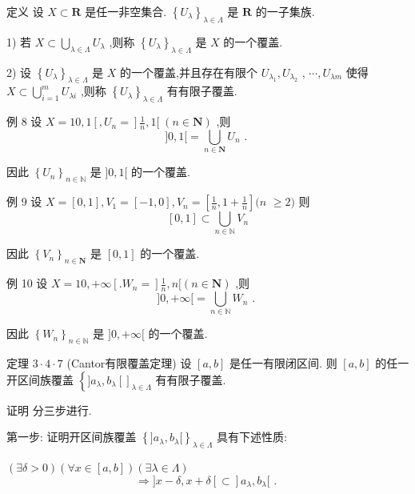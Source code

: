 定义 设 $X \subset  \mathbf{R}$ 是任一非空集合. ${\left\{  {U}_{\lambda }\right\}  }_{\lambda  \in  \Lambda }$ 是 $\mathbf{R}$ 的一子集族.

1) 若 $X \subset  \mathop{\bigcup }\limits_{{\lambda  \in  \Lambda }}{U}_{\lambda }$ ,则称 ${\left\{  {U}_{\lambda }\right\}  }_{\lambda  \in  \Lambda }$ 是 $X$ 的一个覆盖.

2) 设 ${\left\{  {U}_{\lambda }\right\}  }_{\lambda  \in  \Lambda }$ 是 $X$ 的一个覆盖,并且存在有限个 ${U}_{{\lambda }_{1}},{U}_{{\lambda }_{2}}$ , $\cdots ,{U}_{\lambda m}$ 使得 $X \subset  \mathop{\bigcup }\limits_{{i = 1}}^{m}{U}_{\lambda i}$ ,则称 ${\left\{  {U}_{\lambda }\right\}  }_{\lambda  \in  \Lambda }$ 有有限子覆盖.

例 8 设 $X = {10},1\left\lbrack  {,{U}_{n} = }\right\rbrack  \frac{1}{n},1\lbrack \;\left( {n \in  \mathbf{N}}\right)$ ,则
$$\rbrack 0,1\lbrack  = \mathop{\bigcup }\limits_{{n \in  \mathbf{N}}}{U}_{n}\text{ . }$$

因此 ${\left\{  {U}_{n}\right\}  }_{n \in  \mathbb{N}}$ 是 $\rbrack 0,1\lbrack$ 的一个覆盖.

例 9 设 $X = \left\lbrack  {0,1}\right\rbrack  ,{V}_{1} = \left\lbrack  {-1,0}\right\rbrack  ,{V}_{n} = \left\lbrack  {\frac{1}{n},1 + \frac{1}{n}}\right\rbrack  (n$  $\geq  2)$ 则
$$\left\lbrack  {0,1}\right\rbrack   \subset  \mathop{\bigcup }\limits_{{n \in  \mathbb{N}}}{V}_{n}$$

因此 ${\left\{  {V}_{n}\right\}  }_{n \in  \mathbf{N}}$ 是 $\left\lbrack  {0,1}\right\rbrack$ 的一个覆盖.

例 10 设 $X = {10}, + \infty \left\lbrack  {.{W}_{n} = }\right\rbrack  \frac{1}{n},n\lbrack \left( {n \in  \mathbf{N}}\right)$ ,则
$$\rbrack 0, + \infty \lbrack  = \mathop{\bigcup }\limits_{{n \in  \mathbb{N}}}{W}_{n}\text{ . }$$

因此 ${\left\{  {W}_{n}\right\}  }_{n \in  \mathbb{N}}$ 是 $\rbrack 0, + \infty \lbrack$ 的一个覆盖.

定理 $3 \cdot  4 \cdot  7$ (Cantor有限覆盖定理) 设 $\left\lbrack  {a,b}\right\rbrack$ 是任一有限闭区间. 则 $\left\lbrack  {a,b}\right\rbrack$ 的任一开区间族覆盖 $\left\{  {\rbrack {a}_{\lambda },{b}_{\lambda }{\left\lbrack  \right\rbrack  }_{\lambda  \in  \Lambda }}\right.$ 有有限子覆盖.

证明 分三步进行.

第一步: 证明开区间族覆盖 ${\left\{  \rbrack {a}_{\lambda },{b}_{\lambda }\lbrack \right\}  }_{\lambda  \in  \Lambda }$ 具有下述性质:

$\left( {\exists \delta  > 0}\right) \left( {\forall x \in  \left\lbrack  {a,b}\right\rbrack  }\right) \left( {\exists \lambda  \in  \Lambda }\right)$
$$\Rightarrow  \rbrack x - \delta ,x + \delta \left\lbrack   \subset  \right\rbrack  {a}_{\lambda },{b}_{\lambda }\lbrack \text{ . } $$

